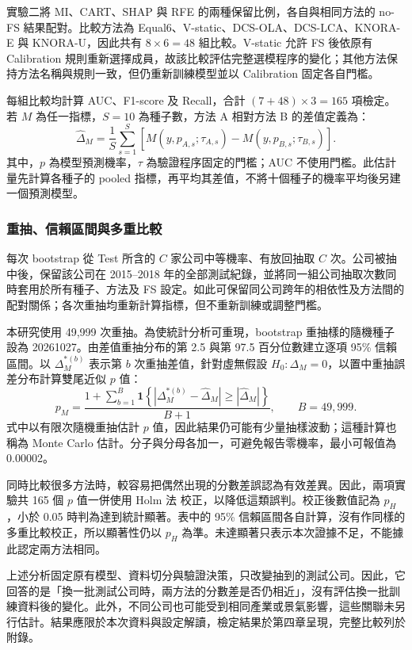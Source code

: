 實驗二將 MI、CART、SHAP 與 RFE 的兩種保留比例，各自與相同方法的 no-FS 結果配對。比較方法為 Equal6、V-static、DCS-OLA、DCS-LCA、KNORA-E 與 KNORA-U，因此共有 \(8\times6=48\) 組比較。V-static 允許 FS 後依原有 Calibration 規則重新選擇成員，故該比較評估完整選模程序的變化；其他方法保持方法名稱與規則一致，但仍重新訓練模型並以 Calibration 固定各自門檻。

每組比較均計算 AUC、F1-score 及 Recall，合計 \((7+48)\times3=165\) 項檢定。若 \(M\) 為任一指標，\(S=10\) 為種子數，方法 A 相對方法 B 的差值定義為：
\begin{equation}\label{eq:stats-difference}
\widehat{\Delta}_M=\frac{1}{S}\sum_{s=1}^{S}
\left[M(y,p_{A,s};\tau_{A,s})-M(y,p_{B,s};\tau_{B,s})\right].
\end{equation}
其中，\(p\) 為模型預測機率，\(\tau\) 為驗證程序固定的門檻；AUC 不使用門檻。此估計量先計算各種子的 pooled 指標，再平均其差值，不將十個種子的機率平均後另建一個預測模型。

\subsubsection{重抽、信賴區間與多重比較}

每次 bootstrap 從 Test 所含的 \(C\) 家公司中等機率、有放回抽取 \(C\) 次。公司被抽中後，保留該公司在 2015--2018 年的全部測試紀錄，並將同一組公司抽取次數同時套用於所有種子、方法及 FS 設定。如此可保留同公司跨年的相依性及方法間的配對關係；各次重抽均重新計算指標，但不重新訓練或調整門檻。

本研究使用 49,999 次重抽。為使統計分析可重現，bootstrap 重抽樣的隨機種子設為 20261027。由差值重抽分布的第 2.5 與第 97.5 百分位數建立逐項 95\% 信賴區間。以 \(\Delta_M^{*(b)}\) 表示第 \(b\) 次重抽差值，針對虛無假設 \(H_0:\Delta_M=0\)，以置中重抽誤差分布計算雙尾近似 \(p\) 值：
\begin{equation}\label{eq:stats-bootstrap-p}
p_M=\frac{1+\sum_{b=1}^{B}\mathbf{1}\!\left\{
\left|\Delta_M^{*(b)}-\widehat{\Delta}_M\right|\geq
\left|\widehat{\Delta}_M\right|\right\}}{B+1},
\qquad B=49{,}999.
\end{equation}
式中以有限次隨機重抽估計 \(p\) 值，因此結果仍可能有少量抽樣波動；這種計算也稱為 Monte Carlo 估計。分子與分母各加一，可避免報告零機率，最小可報值為 0.00002。

同時比較很多方法時，較容易把偶然出現的分數差誤認為有效差異。因此，兩項實驗共 165 個 \(p\) 值一併使用 Holm 法\autocite{holm1979multiple} 校正，以降低這類誤判。校正後數值記為 \(p_H\)，小於 0.05 時判為達到統計顯著。表中的 95\% 信賴區間各自計算，沒有作同樣的多重比較校正，所以顯著性仍以 \(p_H\) 為準。未達顯著只表示本次證據不足，不能據此認定兩方法相同。

上述分析固定原有模型、資料切分與驗證決策，只改變抽到的測試公司。因此，它回答的是「換一批測試公司時，兩方法的分數差是否仍相近」，沒有評估換一批訓練資料後的變化。此外，不同公司也可能受到相同產業或景氣影響，這些關聯未另行估計。結果應限於本次資料與設定解讀，檢定結果於第四章呈現，完整比較列於附錄。
\endgroup
